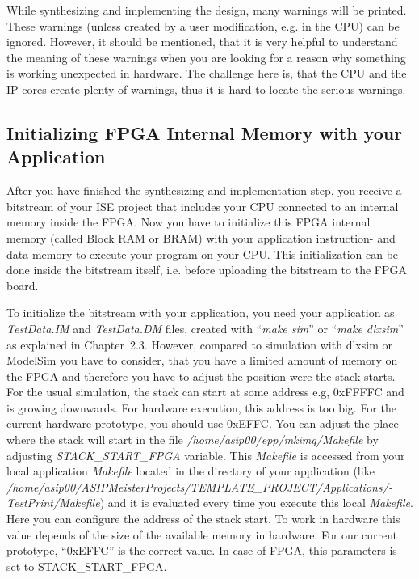 \documentclass[
]{article}
\begin{document}
While synthesizing and implementing the design, many warnings will be
printed. These warnings (unless created by a user modification, e.g. in
the CPU) can be ignored. However, it should be mentioned, that it is
very helpful to understand the meaning of these warnings when you are
looking for a reason why something is working unexpected in hardware.
The challenge here is, that the CPU and the IP cores create plenty of
warnings, thus it is hard to locate the serious warnings.

\hypertarget{initializing-fpga-internal-memory-with-your-application}{%
\subsection{Initializing FPGA Internal Memory with your
Application}\label{initializing-fpga-internal-memory-with-your-application}}

After you have finished the synthesizing and implementation step, you
receive a bitstream of your ISE project that includes your CPU connected
to an internal memory inside the FPGA. Now you have to initialize this
FPGA internal memory (called Block RAM or BRAM) with your application
instruction- and data memory to execute your program on your CPU. This
initialization can be done inside the bitstream itself, i.e. before
uploading the bitstream to the FPGA board.

To initialize the bitstream with your application, you need your
application as \emph{TestData.IM} and \emph{TestData.DM} files, created
with ``\emph{make sim}'' or ``\emph{make dlxsim}'' as explained in
Chapter~2.3. However, compared to simulation with dlxsim or ModelSim you
have to consider, that you have a limited amount of memory on the FPGA
and therefore you have to adjust the position were the stack starts. For
the usual simulation, the stack can start at some address e.g, 0xFFFFC
and is growing downwards. For hardware execution, this address is too
big. For the current hardware prototype, you should use 0xEFFC. You can
adjust the place where the stack will start in the file
\emph{/home/asip00/epp/mkimg/Makefile} by adjusting
\emph{STACK\_START\_FPGA} variable. This \emph{Makefile} is accessed
from your local application \emph{Makefile} located in the directory of
your application (like
\emph{/home/asip00/­ASIPMeisterProjects/­TEMPLATE\_PROJECT/­Applications/­TestPrint/Makefile})
and it is evaluated every time you execute this local \emph{Makefile}.
Here you can configure the address of the stack start. To work in
hardware this value depends of the size of the available memory in
hardware. For our current prototype, ``0xEFFC'' is the correct value. In
case of FPGA, this parameters is set to STACK\_START\_FPGA.
\end{document}

